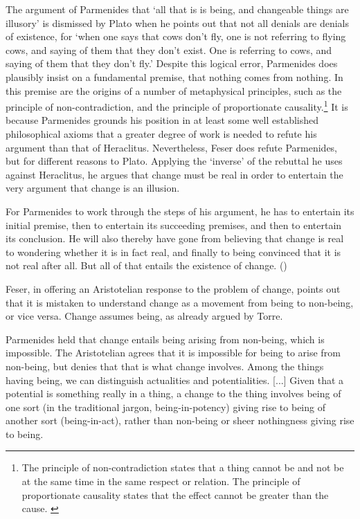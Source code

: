 The argument of Parmenides that `all that is is being, and changeable things are illusory' is dismissed by Plato when he points out that not all denials are denials of existence, for `when one says that cows don't fly, one is not referring to flying cows, and saying of them that they don't exist. One is referring to cows, and saying of them that they don't fly.' Despite this logical error, Parmenides does plausibly insist on a fundamental premise, that nothing comes from nothing. In this premise  are the origins of a number of metaphysical principles, such as the principle of non-contradiction, and the principle of proportionate causality.\footnote{The principle of non-contradiction states that a thing cannot be and not be at the same time in the same respect or relation. The principle of proportionate causality states that the effect cannot be greater than the cause. \parencite[][31]{wuellner2011summary}}
It is because Parmenides grounds his position in at least some well established philosophical axioms that a greater degree of work is needed to refute his argument than that of Heraclitus. Nevertheless, Feser does refute Parmenides, but for different reasons to Plato. Applying the `inverse' of the rebuttal he uses against Heraclitus, he argues that change must be real in order to entertain the very argument that change is an illusion.
\begin{quoting}
For Parmenides to work through the steps of his argument, he has to entertain its initial premise, then to entertain its succeeding premises, and then to entertain its conclusion. He will also thereby have gone from believing that change is real to wondering whether it is in fact real, and finally to being convinced that it is not real after all. But all of that entails the existence of change. (\citeyear[][14-15]{feser2019aristotle})
\end{quoting}
Feser, in offering an Aristotelian response to the problem of change, points out that it is mistaken to understand change as a movement from being to non-being, or vice versa. Change assumes being, as already argued by Torre.
\begin{quoting}
Parmenides held that change entails being arising from non-being, which is impossible. The Aristotelian agrees that it is impossible for being to arise from non-being, but denies that that is what change involves. Among the things having being, we can distinguish actualities and potentialities. [...] Given that a potential is something really in a thing, a change to the thing involves being of one sort (in the traditional jargon, being-in-potency) giving rise to being of another sort (being-in-act), rather than non-being or sheer nothingness giving rise to being. \parencite[][15]{feser2019aristotle}
\end{quoting}


